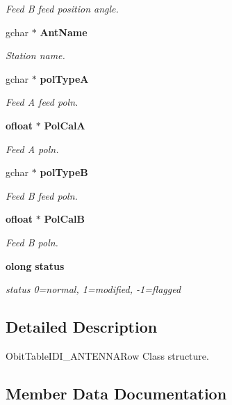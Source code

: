 \begin{CompactItemize}
\begin{CompactList}\small\item\em Feed B feed position angle. \item\end{CompactList}\item 
gchar $\ast$ {\bf Ant\-Name}
\begin{CompactList}\small\item\em Station name. \item\end{CompactList}\item 
gchar $\ast$ {\bf pol\-Type\-A}
\begin{CompactList}\small\item\em Feed A feed poln. \item\end{CompactList}\item 
{\bf ofloat} $\ast$ {\bf Pol\-Cal\-A}
\begin{CompactList}\small\item\em Feed A poln. \item\end{CompactList}\item 
gchar $\ast$ {\bf pol\-Type\-B}
\begin{CompactList}\small\item\em Feed B feed poln. \item\end{CompactList}\item 
{\bf ofloat} $\ast$ {\bf Pol\-Cal\-B}
\begin{CompactList}\small\item\em Feed B poln. \item\end{CompactList}\item 
{\bf olong} {\bf status}
\begin{CompactList}\small\item\em status 0=normal, 1=modified, -1=flagged \item\end{CompactList}\end{CompactItemize}


\subsection{Detailed Description}
Obit\-Table\-IDI\_\-ANTENNARow Class structure. 



\subsection{Member Data Documentation}
